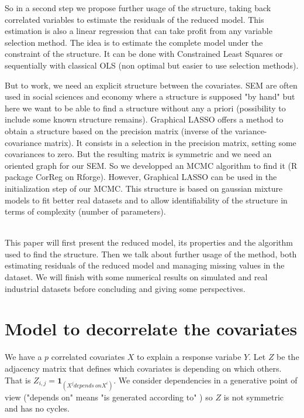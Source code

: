 \documentclass[11pt,a4paper]{article}
\begin{document}
 	So in a second step we propose further usage of the structure, taking back correlated variables to estimate the residuals of the reduced model. This estimation is also a linear regression that can take profit from any variable selection method. The idea is to estimate the complete model under the constraint of the structure. It can be done with Constrained Least Squares \cite{amemiya1985advanced} or sequentially with classical OLS (non optimal but easier to use selection methods).
 	
 	
 	
But to work, we need an explicit structure between the covariates. SEM are often used in social sciences and economy where a structure is supposed "by hand" but here we want to be able to find a structure without any a priori (possibility to include some known structure remains). Graphical LASSO \cite{friedman2008sparse} offers a method to obtain a structure based on the precision matrix (inverse of the variance-covariance matrix). It consists in a selection in the precision matrix, setting some covariances to zero. But the resulting matrix is symmetric and we need an oriented graph for our SEM. So we developped an MCMC algorithm to find it (R package CorReg on Rforge). However, Graphical LASSO can be used in the initialization step of our MCMC. This structure is based on gaussian mixture models to fit better real datasets and to allow identifiability of the structure in terms of complexity (number of parameters).
 	
 	~\\
 	
 	This paper will first present the reduced model, its properties and the algorithm used to find the structure. Then we talk about further usage of the method, both estimating residuals of the reduced model and managing missing values in the dataset. 
 	We will finish with some numerical results on simulated and real industrial datasets before concluding and giving some perspectives.
	
\section{Model to decorrelate the covariates}


We have a $p$ correlated covariates $X$ to explain a response variabe $Y$.
Let $Z$ be the adjacency matrix that defines which covariates is depending on which others. That is $Z_{i,j}=\mathbf{1}_{(X^j depends\ on X^i)}$. We consider dependencies in a generative point of view ("depends on" means "is generated according to" ) so $Z$ is not symmetric and has no cycles. 
	
\end{document}
